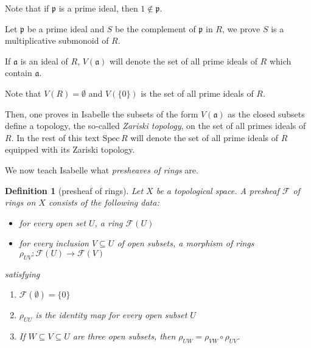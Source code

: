 \documentclass[12pt]{scrartcl}
\newtheorem{definition}[proposition]{Definition}
\begin{document}

Note that if $\mathfrak{p}$ is a prime ideal, then $1 \notin \mathfrak{p}$.


Let $\mathfrak{p}$ be a prime ideal and $S$ be the complement of $\mathfrak{p}$ in $R$,  we prove $S$ is a multiplicative submonoid of $R$.


If $\mathfrak{a}$ is an ideal of $R$, $V(\mathfrak{a})$ will denote the set of all prime ideals of $R$ which contain $\mathfrak{a}$. 


Note that $V(R) = \emptyset$ and $V(\lbrace 0 \rbrace)$ is the set of all prime ideals of $R$.


Then, one proves in Isabelle the subsets of the form $V(\mathfrak{a})$ as the closed subsets define a topology, the so-called \emph{Zariski topology}\label{zariskitop}, on the set of all primes ideals of $R$. In the rest of this text $\text{Spec}\,R$ will denote the set of all prime ideals of $R$ equipped with its Zariski topology.


We now teach Isabelle what \emph{presheaves of rings} are. 

\begin{definition}[presheaf of rings]
	Let $X$ be a topological space. A presheaf $\mathscr{F}$ of rings on $X$ consists of the following data:
	\begin{itemize}
		\item for every open set $U$, a ring $\mathscr{F}(U)$
		\item for every inclusion $V \subseteq U$ of open subsets, a morphism of rings $\rho_{UV}: \mathscr{F}(U) \rightarrow \mathscr{F}(V)$  
	\end{itemize}
satisfying 
	\begin{enumerate}
		\item $\mathscr{F}(\emptyset) = \lbrace 0 \rbrace$
		\item $\rho_{UU}$ is the identity map for every open subset $U$
		\item  If $W \subseteq V \subseteq U$ are three open subsets, then $\rho_{UW} = \rho_{VW} \circ \rho_{UV}$.
	\end{enumerate}
\end{definition}
\end{document}
